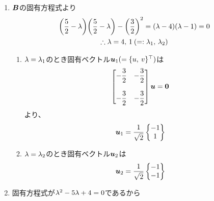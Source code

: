 \begin{ans*}
  ${}$
  \begin{enumerate}[label=(\arabic*)]
    \item $\bm{B}$の固有方程式より
    \begin{gather}
      \biggl(\frac{5}{2}-{\lambda}\biggr)\biggl(\frac{5}{2}-{\lambda}\biggr)-\biggl(\frac{3}{2}\biggr)^2
      = ({\lambda} - 4)({\lambda} - 1) = 0 \\
      \therefore {\lambda} = 4,\, 1\:(=:{\lambda}_1,\,{\lambda}_2)
    \end{gather}
    \begin{enumerate}[label=(\roman*)]
      \item ${\lambda}={\lambda}_1$のとき固有ベクトル${\bm{u}}_1(=\{u,\:v\}^\top)$は
      \begin{gather}
        \begin{bmatrix}
          \displaystyle -\frac{3}{2} & \displaystyle -\frac{3}{2} \\
          & \\
          \displaystyle -\frac{3}{2} & \displaystyle -\frac{3}{2}
        \end{bmatrix}{\bm{u}} = \bm{0}
      \end{gather}
      より、
      \begin{gather}
        {\bm{u}}_1 = \frac{1}{\sqrt{2}}\begin{Bmatrix}
          -1 \\ 1
        \end{Bmatrix}
      \end{gather}
      \item ${\lambda}={\lambda}_2$のとき固有ベクトル${\bm{u}}_2$は
      \begin{gather}
        {\bm{u}}_2 = \frac{1}{\sqrt{2}}\begin{Bmatrix}
          -1 \\ -1
        \end{Bmatrix}
      \end{gather}
    \end{enumerate}
    \item 固有方程式が${\lambda}^2-5{\lambda} + 4=0$であるから

\end{enumerate}
\end{ans*}
